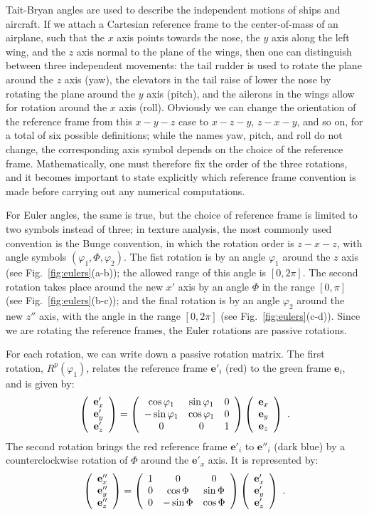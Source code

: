 Tait-Bryan angles are used to describe the independent motions of ships and aircraft.  If we attach a Cartesian reference frame to the center-of-mass of an airplane, such that the $x$ axis points towards the nose, the $y$ axis along the left wing, and the $z$ axis normal to the plane of the wings, then one can distinguish between three independent movements: the tail rudder is used to rotate the plane around the $z$ axis (yaw), the elevators in the tail raise of lower the nose by rotating the plane around the $y$ axis (pitch), and the ailerons in the wings allow for rotation around the $x$ axis (roll).  Obviously we can change the orientation of the reference frame from this $x-y-z$ case to $x-z-y$, $z-x-y$, and so on, for a total of six possible definitions; while the names yaw, pitch, and roll do not change, the corresponding axis symbol depends on the choice of the reference frame.  Mathematically, one must therefore fix the order of the three rotations, and it becomes important to state explicitly which reference frame convention is made before carrying out any numerical computations.

For Euler angles, the same is true, but the choice of reference frame is limited to two symbols instead of three; in texture analysis, the most commonly used convention is the Bunge convention, in which the rotation order is $z-x-z$, with angle symbols $(\varphi_1,\Phi,\varphi_2)$.  The fist rotation is by an angle $\varphi_1$ around the $z$ axis (see Fig.~\ref{fig:eulers}(a-b)); the allowed range of this angle is $[0,2\pi]$. The second rotation takes place around the new $x'$ axis by an angle $\Phi$ in the range $[0,\pi]$ (see Fig.~\ref{fig:eulers}(b-c)); and the final rotation is by an angle $\varphi_2$ around the new $z''$ axis, with the angle in the range $[0,2\pi]$ (see Fig.~\ref{fig:eulers}(c-d)).  Since we are rotating the reference frames, the Euler rotations are passive rotations.

For each rotation, we can write down a passive rotation matrix.  The first rotation, $R^p(\varphi_1)$, relates the reference
frame $\mathbf{e}'_i$ (red) to the green frame $\mathbf{e}_i$, and is given by:
\begin{equation}
	\left(\begin{array}{c} \mathbf{e}'_x \\ \mathbf{e}'_y \\ \mathbf{e}'_z \end{array}\right) = 
	\left(\begin{array}{ccc} \cos\varphi_1 & \sin\varphi_1 & 0 \\ -\sin\varphi_1 & \cos\varphi_1 & 0 \\ 0 & 0 & 1\end{array}\right)
	\left(\begin{array}{c} \mathbf{e}_x \\ \mathbf{e}_y \\ \mathbf{e}_z \end{array}\right)\ . 
\end{equation}
The second rotation brings the red reference frame $\mathbf{e}'_i$ to $\mathbf{e}''_i$ (dark blue) 
by a counterclockwise rotation of 
$\Phi$ around the $\mathbf{e}'_x$ axis.  It is represented by:
\begin{equation}
	\columnthreeb{\mathbf{e}''_x}{\mathbf{e}''_y}{\mathbf{e}''_z} = 
	\matrixtbt{1}{0}{0}{0}{\cos\Phi}{\sin\Phi}{0}{-\sin\Phi}{\cos\Phi}
	\columnthreeb{\mathbf{e}'_x}{\mathbf{e}'_y}{\mathbf{e}'_z}\ . 
\end{equation}

